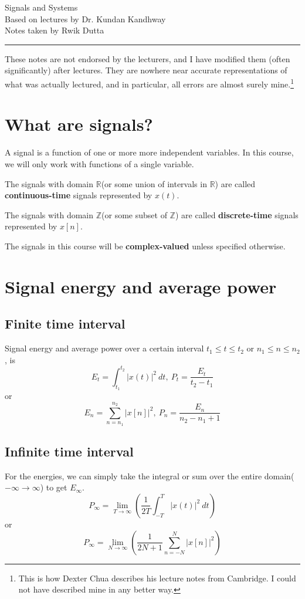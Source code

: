 \documentclass[10pt, a4paper]{extarticle}
\theoremstyle{definition}
\begin{document}
	\begin{center}
		\fontsize{25}{60}\selectfont Signals and Systems \\
		\large Based on lectures by Dr. Kundan Kandhway\\
		Notes taken by Rwik Dutta
	\end{center}
	\hrule
	\begin{center}
		These notes are not endorsed by the lecturers, and I have modified them (often
significantly) after lectures. They are nowhere near accurate representations of what
was actually lectured, and in particular, all errors are almost surely mine.\footnote[1]{This is how Dexter Chua describes his lecture notes from Cambridge. I could not have described mine in any better way.}
	\end{center}
	\tableofcontents 
	
	\newpage

	\section{What are signals?}
	A signal is a function of one or more more independent variables. In this course, we will only work with functions of a single variable.

	The signals with domain $\mathbb{R}$(or some union of intervals in $\mathbb{R}$) are called \textbf{continuous-time} signals represented by $x(t)$.

	The signals with domain $\mathbb{Z}$(or some subset of $\mathbb{Z}$) are called \textbf{discrete-time} signals represented by $x[n]$.

	The signals in this course will be \textbf{complex-valued} unless specified otherwise.

	\section{Signal energy and average power}
	\subsection{Finite time interval}
	Signal energy and average power over a certain interval $t_1\leq t\leq t_2$ or $n_1\leq n\leq n_2$, is
	\[E_t=\int_{t_1}^{t_2}|x(t)|^2\ dt,\ P_t=\frac{E_t}{t_2-t_1}\]
	or\[E_n=\sum_{n=n_1}^{n_2}|x[n]|^2,\ P_n=\frac{E_n}{n_2-n_1+1}\]
	
	\subsection{Infinite time interval}
	For the energies, we can simply take the integral or sum over the entire domain($-\infty\to\infty$) to get $E_\infty$.
	\[P_{\infty}=\lim_{T\to\infty}\left(\frac{1}{2T}\int_{-T}^{T}|x(t)|^2\ dt\right)\]
	or\[P_\infty=\lim_{N\to\infty}\left(\frac{1}{2N+1}\sum_{n=-N}^{N}|x[n]|^2\right)\]
\end{document}
